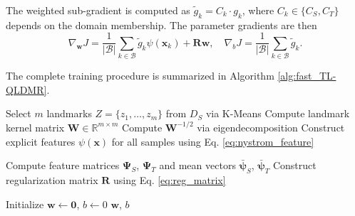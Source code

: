 \documentclass[a4paper]{cas-sc}
\begin{document}
The weighted sub-gradient is computed as $\tilde{g}_k = C_k \cdot g_k$, where $C_k \in \{C_S, C_T\}$ depends on the domain membership. The parameter gradients are then
\begin{equation}
\label{eq:param_gradients}
\nabla_{\boldsymbol{w}} J = \frac{1}{|\mathcal{B}|} \sum_{k \in \mathcal{B}} \tilde{g}_k \psi(\boldsymbol{x}_k) + \boldsymbol{R} \boldsymbol{w}, \quad \nabla_b J = \frac{1}{|\mathcal{B}|} \sum_{k \in \mathcal{B}} \tilde{g}_k.
\end{equation}

The complete training procedure is summarized in Algorithm \ref{alg:fast_TL-QLDMR}.

\begin{algorithm}[t]
\caption{TL-QLDMR via Nystr\"{o}m-SGD}
\label{alg:fast_TL-QLDMR}

Select $m$ landmarks $Z = \{z_1, \ldots, z_m\}$ from $D_S$ via K-Means\;
Compute landmark kernel matrix $\boldsymbol{W} \in \mathbb{R}^{m \times m}$\;
Compute $\boldsymbol{W}^{-1/2}$ via eigendecomposition\;
Construct explicit features $\psi(\boldsymbol{x})$ for all samples using Eq. \eqref{eq:nystrom_feature}\;

Compute feature matrices $\boldsymbol{\Psi}_S$, $\boldsymbol{\Psi}_T$ and mean vectors $\bar{\boldsymbol{\psi}}_S$, $\bar{\boldsymbol{\psi}}_T$\;
Construct regularization matrix $\boldsymbol{R}$ using Eq. \eqref{eq:reg_matrix}\;

Initialize $\boldsymbol{w} \leftarrow \boldsymbol{0}$, $b \leftarrow 0$\;
\Return $\boldsymbol{w}$, $b$\;
\end{algorithm}
\end{document}
